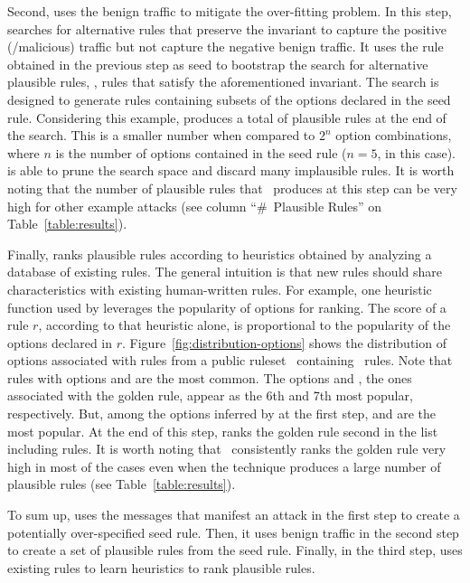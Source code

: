 \documentclass[conference]{IEEEtran}
\begin{document}
Second, \tname{} uses the benign traffic to mitigate the over-fitting
problem. In this step, \tname{} searches for alternative rules that
preserve the invariant to capture the positive (/malicious) traffic
but not capture the negative benign traffic. It uses the rule obtained
in the previous step as seed to bootstrap the search for alternative
plausible rules, \ie{}, rules that satisfy the aforementioned
invariant. The search is designed to generate rules containing subsets
of the options declared in the seed rule. Considering this example,
\tname{} produces a total of \pingscanplausible{} plausible rules at
the end of the search. This is a smaller number when compared to $2^n$
option combinations, where $n$ is the number of options contained in
the seed rule ($n=5$, in this case). \tname{} is able to prune the
search space and discard many implausible rules. It is worth noting
that the number of plausible rules that \tname\ produces at this step
can be very high for other example attacks (see column ``\#~Plausible
Rules'' on Table~\ref{table:results}).

Finally, \tname{} ranks plausible rules according to heuristics
obtained by analyzing a database of existing rules. The general
intuition is that new rules should share characteristics with existing
human-written rules. For example, one heuristic function used by
\tname{} leverages the popularity of options for ranking.  The score
of a rule $r$, according to that heuristic alone, is proportional to
the popularity of the options declared in
$r$. Figure~\ref{fig:distribution-options} shows the distribution of
options associated with rules from a public
ruleset~\cite{emerging-threats-open} containing
\numrulessuri\ rules. Note that rules with options 
and  are the most common. The options  and
, the ones associated with the golden rule, appear as
the 6th and 7th most popular, respectively. But, among the options
inferred by \tname{} at the first step,  and
 are the most popular. At the end of this step, \tname{}
ranks the golden rule second in the list including
\pingscanplausible{} rules. It is worth noting that
\tname\ consistently ranks the golden rule very high in most of the
cases even when the technique produces a large number of plausible
rules (see Table~\ref{table:results}).

To sum up, \tname{} uses the messages that manifest an attack in the
first step to create a potentially over-specified seed rule. Then, it
uses benign traffic in the second step to create a set of plausible
rules from the seed rule. Finally, in the third step, \tname{} uses
existing rules to learn heuristics to rank plausible rules.
\end{document}
